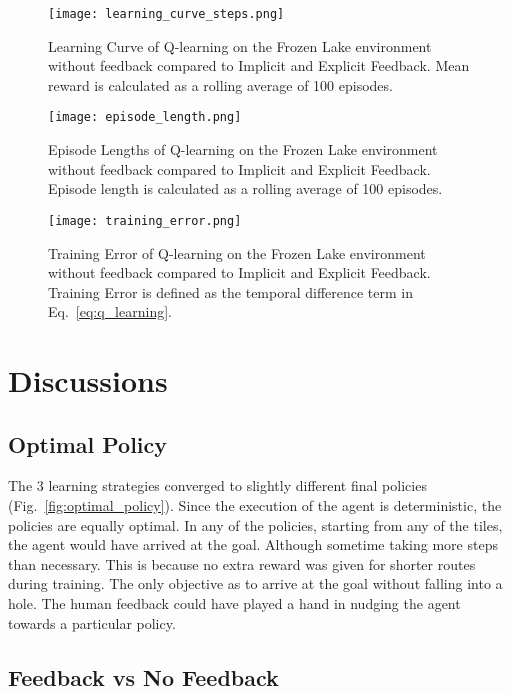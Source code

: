 \documentclass[conference]{IEEEtran}
\begin{document}
\begin{figure}
    \centering
    \texttt{[image: learning\_curve\_steps.png]}
    \caption{Learning Curve of Q-learning on the Frozen Lake environment without feedback compared to Implicit and Explicit Feedback. Mean reward is calculated as a rolling average of 100 episodes.}
    \label{fig:learning_curve_steps}
\end{figure}

\begin{figure}
    \centering
    \texttt{[image: episode\_length.png]}
    \caption{Episode Lengths of Q-learning on the Frozen Lake environment without feedback compared to Implicit and Explicit Feedback. Episode length is calculated as a rolling average of 100 episodes.}
    \label{fig:episode_length}
\end{figure}

\begin{figure}
    \centering
    \texttt{[image: training\_error.png]}
    \caption{Training Error of Q-learning on the Frozen Lake environment without feedback compared to Implicit and Explicit Feedback. Training Error is defined as the temporal difference term in Eq.~\ref{eq:q_learning}.}
    \label{fig:training_error}
\end{figure}

\section{Discussions}

\subsection{Optimal Policy}

The 3 learning strategies converged to slightly different final policies (Fig.~\ref{fig:optimal_policy}). Since the execution of the agent is deterministic, the policies are equally optimal. In any of the policies, starting from any of the tiles, the agent would have arrived at the goal. Although sometime taking more steps than necessary. This is because no extra reward was given for shorter routes during training. The only objective as to arrive at the goal without falling into a hole. The human feedback could have played a hand in nudging the agent towards a particular policy.

\subsection{Feedback vs No Feedback}
\end{document}
